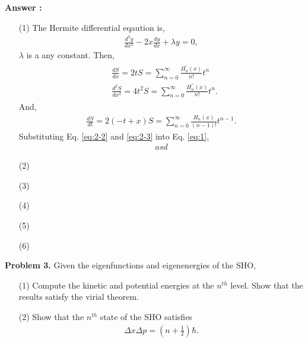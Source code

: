 \documentclass[floatfix,nofootinbib,superscriptaddress,fleqn]{revtex4-2}
\begin{document}
\noindent \textbf{Answer : }
\begin{itemize}
\item[(1)] The Hermite differential eqaution is,
\begin{align}
  \frac{d^2y}{dx^2}-2x\frac{dy}{dx}+\lambda y = 0,
\end{align}
$\lambda$ is a any constant. Then,
\begin{align}\label{eq:2-2}
  \begin{split}
    &\frac{dS}{dx} = 2tS = \sum^\infty_{n=0}\frac{H^\prime_n(x)}{n!}t^n  \\
    &\frac{d^2S}{dx^2} = 4t^2S=\sum^\infty_{n=0}\frac{H^{\prime\prime}_n(x)}{n!}t^n.
  \end{split}
\end{align}
And,
\begin{align}\label{eq:2-3}
  \frac{dS}{dt} = 2(-t+x)S = \sum^\infty_{n=0}\frac{H_n(x)}{(n-1)!}t^{n-1}.
\end{align}
Substituting Eq. \eqref{eq:2-2} and \eqref{eq:2-3} into Eq. \eqref{eq:1},
\begin{align}
  asd
\end{align} 
\item[(2)]
\item[(3)]
\item[(4)]
\item[(5)]
\item[(6)]
\end{itemize}


\noindent \textbf{Problem 3.} 
Given the eigenfunctions and eigenenergies of the SHO, 
\begin{itemize}
\item[(1)] Compute the kinetic and potential energies at the $n^{th}$
  level.  Show that the results satisfy the virial theorem. 
\item[(2)] Show that the $n^{th}$ state of the SHO satisfies 
  \begin{align}
    \Delta x \Delta p = \left(n+\frac12\right)\hbar.
  \end{align}
\end{itemize}

\vspace{1cm}
\end{document}
